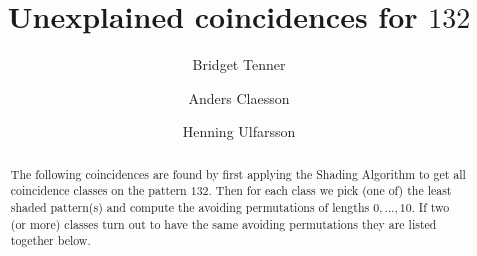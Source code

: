 \documentclass[12pt,reqno]{amsart}
\theoremstyle{plain}
\theoremstyle{definition}
\numberwithin{equation}{section}
\begin{document}
\title{Unexplained coincidences for $132$}

\author[Tenner]{Bridget Tenner}
\author[Claesson]{Anders Claesson}
\author[Ulfarsson]{Henning Ulfarsson}

\address[Tenner]{School of Computer Science, Reykjav\'ik University, Menntavegi 1, 101 Reykjav\'ik, \mbox{Iceland}}
\address[Claesson]{Department of Computer and Information Sciences, University of Strathclyde, Glasgow G1 1XH, UK}
\address[Ulfarsson]{School of Computer Science, Reykjav\'ik University, Menntavegi 1, 101 Reykjav\'ik, Iceland}



\begin{abstract}
The following coincidences are found by first applying the Shading Algorithm to
get all coincidence classes on the pattern $132$. Then for each class we pick (one of) the least shaded pattern(s)
and compute the avoiding permutations of lengths $0, \dots, 10$. If two (or more) classes turn out to have the same avoiding permutations they
are listed together below.
\end{abstract}



\maketitle
\end{document}
